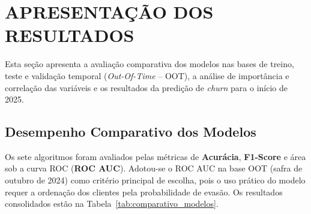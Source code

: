 \section{APRESENTAÇÃO DOS RESULTADOS}\label{sec:conteudo4}

Esta seção apresenta a avaliação comparativa dos modelos nas bases de treino, teste e validação temporal (\textit{Out-Of-Time} -- OOT), a análise de importância e correlação das variáveis e os resultados da predição de \textit{churn} para o início de 2025.

\subsection{Desempenho Comparativo dos Modelos}\label{subsec:desempenho_modelos}

Os sete algoritmos foram avaliados pelas métricas de \textbf{Acurácia}, \textbf{F1-Score} e área sob a curva ROC (\textbf{ROC AUC}). Adotou-se o ROC AUC na base OOT (safra de outubro de 2024) como critério principal de escolha, pois o uso prático do modelo requer a ordenação dos clientes pela probabilidade de evasão. Os resultados consolidados estão na Tabela~\ref{tab:comparativo_modelos}.

\begin{table}[H]
\centering
\caption{Comparativo de desempenho dos modelos (ordenado por ROC AUC na base OOT)}
\label{tab:comparativo_modelos}
\end{table}

